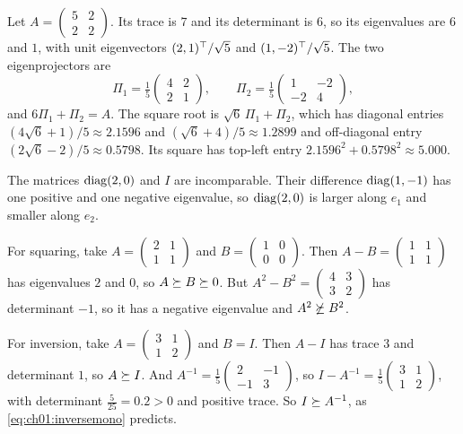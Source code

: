 \begin{example}\label{ex:ch01:spectral}
Let $A=\begin{pmatrix}5&2\\2&2\end{pmatrix}$. Its trace is $7$ and its
determinant is $6$, so its eigenvalues are $6$ and $1$, with unit
eigenvectors $(2,1)^{\top}/\sqrt5$ and $(1,-2)^{\top}/\sqrt5$. The two eigenprojectors are
\[
\Pi_1=\tfrac15\begin{pmatrix}4&2\\2&1\end{pmatrix},\qquad
\Pi_2=\tfrac15\begin{pmatrix}1&-2\\-2&4\end{pmatrix},
\]
and $6\Pi_1+\Pi_2=A$. The square root is $\sqrt6\,\Pi_1+\Pi_2$, which has
diagonal entries $(4\sqrt6+1)/5\approx2.1596$ and $(\sqrt6+4)/5\approx1.2899$
and off-diagonal entry $(2\sqrt6-2)/5\approx0.5798$. Its square has top-left
entry $2.1596^2+0.5798^2\approx5.000$.

The matrices $\operatorname{diag}(2,0)$ and $I$ are incomparable. Their difference
$\operatorname{diag}(1,-1)$ has one positive and one negative eigenvalue, so
$\operatorname{diag}(2,0)$ is larger along $e_1$ and smaller along $e_2$.

For squaring, take $A=\begin{pmatrix}2&1\\1&1\end{pmatrix}$ and
$B=\begin{pmatrix}1&0\\0&0\end{pmatrix}$. Then
$A-B=\begin{pmatrix}1&1\\1&1\end{pmatrix}$ has eigenvalues $2$ and $0$, so
$A\succeq B\succeq 0$. But $A^2-B^2=\begin{pmatrix}4&3\\3&2\end{pmatrix}$ has
determinant $-1$, so it has a negative eigenvalue and $A^2\not\succeq B^2$.

For inversion, take $A=\begin{pmatrix}3&1\\1&2\end{pmatrix}$ and $B=I$. Then
$A-I$ has trace $3$ and determinant $1$, so $A\succeq I$. And
$A^{-1}=\tfrac15\begin{pmatrix}2&-1\\-1&3\end{pmatrix}$, so
$I-A^{-1}=\tfrac15\begin{pmatrix}3&1\\1&2\end{pmatrix}$, with determinant
$\tfrac{5}{25}=0.2>0$ and positive trace. So $I\succeq A^{-1}$, as
\cref{eq:ch01:inversemono} predicts.
\end{example}

